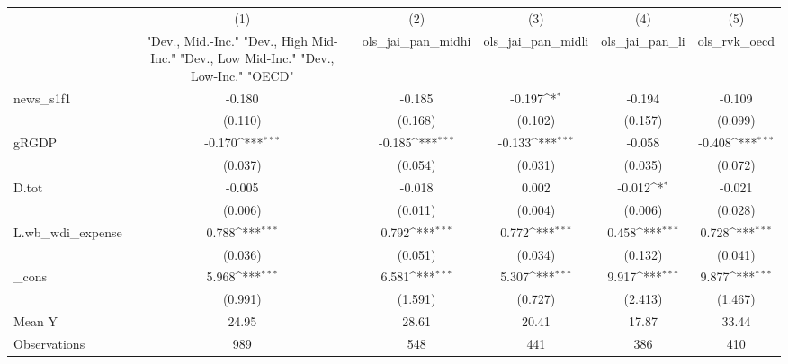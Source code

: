 {
\def\sym#1{\ifmmode^{#1}\else\(^{#1}\)\fi}
\begin{tabular}{l*{5}{c}}
\toprule
            &\multicolumn{1}{c}{(1)}&\multicolumn{1}{c}{(2)}&\multicolumn{1}{c}{(3)}&\multicolumn{1}{c}{(4)}&\multicolumn{1}{c}{(5)}\\
            &\multicolumn{1}{c}{ "Dev., Mid.-Inc." "Dev., High Mid-Inc." "Dev., Low Mid-Inc." "Dev., Low-Inc." "OECD" }&\multicolumn{1}{c}{ols\_jai\_pan\_midhi}&\multicolumn{1}{c}{ols\_jai\_pan\_midli}&\multicolumn{1}{c}{ols\_jai\_pan\_li}&\multicolumn{1}{c}{ols\_rvk\_oecd}\\
\midrule
news\_s1f1   &      -0.180         &      -0.185         &      -0.197\sym{*}  &      -0.194         &      -0.109         \\
            &     (0.110)         &     (0.168)         &     (0.102)         &     (0.157)         &     (0.099)         \\
\addlinespace
gRGDP       &      -0.170\sym{***}&      -0.185\sym{***}&      -0.133\sym{***}&      -0.058         &      -0.408\sym{***}\\
            &     (0.037)         &     (0.054)         &     (0.031)         &     (0.035)         &     (0.072)         \\
\addlinespace
D.tot       &      -0.005         &      -0.018         &       0.002         &      -0.012\sym{*}  &      -0.021         \\
            &     (0.006)         &     (0.011)         &     (0.004)         &     (0.006)         &     (0.028)         \\
\addlinespace
L.wb\_wdi\_expense&       0.788\sym{***}&       0.792\sym{***}&       0.772\sym{***}&       0.458\sym{***}&       0.728\sym{***}\\
            &     (0.036)         &     (0.051)         &     (0.034)         &     (0.132)         &     (0.041)         \\
\addlinespace
\_cons      &       5.968\sym{***}&       6.581\sym{***}&       5.307\sym{***}&       9.917\sym{***}&       9.877\sym{***}\\
            &     (0.991)         &     (1.591)         &     (0.727)         &     (2.413)         &     (1.467)         \\
\midrule
Mean Y      &       24.95         &       28.61         &       20.41         &       17.87         &       33.44         \\
Observations&         989         &         548         &         441         &         386         &         410         \\
\bottomrule
\end{tabular}
}

